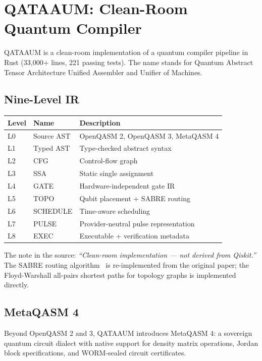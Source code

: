\documentclass[11pt,a4paper]{article}
\begin{document}
\section{QATAAUM: Clean-Room Quantum Compiler}

QATAAUM is a clean-room implementation of a quantum compiler pipeline
in Rust (33,000+ lines, 221 passing tests). The name stands for
Quantum Abstract Tensor Architecture Unified Assembler and Unifier
of Machines.

\subsection{Nine-Level IR}

\begin{center}
\begin{tabular}{lll}
\toprule
\textbf{Level} & \textbf{Name} & \textbf{Description} \\
\midrule
L0 & Source AST & OpenQASM 2, OpenQASM 3, MetaQASM 4 \\
L1 & Typed AST & Type-checked abstract syntax \\
L2 & CFG & Control-flow graph \\
L3 & SSA & Static single assignment \\
L4 & GATE & Hardware-independent gate IR \\
L5 & TOPO & Qubit placement + SABRE routing \\
L6 & SCHEDULE & Time-aware scheduling \\
L7 & PULSE & Provider-neutral pulse representation \\
L8 & EXEC & Executable + verification metadata \\
\bottomrule
\end{tabular}
\end{center}

The note in the source: \textit{``Clean-room implementation --- not
derived from Qiskit.''} The SABRE routing algorithm~\cite{li2019} is
re-implemented from the original paper; the Floyd-Warshall all-pairs
shortest paths for topology graphs is implemented directly.

\subsection{MetaQASM 4}

Beyond OpenQASM 2 and 3, QATAAUM introduces MetaQASM 4: a sovereign
quantum circuit dialect with native support for density matrix operations,
Jordan block specifications, and WORM-sealed circuit certificates.
\end{document}
